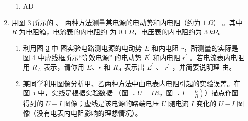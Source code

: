\begin{enumerate}
{\begin{enumerate}
\begin{center}
\end{center}
\item 	
AD
\end{enumerate}
} 


\item 
用图 \ref{2020:北京16:1} 所示的  、  两种方法测量某电源的电动势和内电阻（约为 $ 1 \ \Omega $）
。其中 $ R $ 为电阻箱，电流表的内电阻约
为 $ 0.1 \ \Omega $，电压表的内电阻约为 $ 3 \ k\Omega $。
\begin{figure}[h!]
\centering
\begin{subfigure}{0.4\linewidth}
\centering
 
\caption{}\label{2020:北京16:1a}
\end{subfigure}
\hfil
\begin{subfigure}{0.4\linewidth}
\centering
 
\caption{}\label{2020:北京16:1b}
\end{subfigure}
\caption{}\label{2020:北京16:1}
\end{figure}

\begin{enumerate}
\item
利用图 \ref{2020:北京16:1} 中  图实验电路测电源的电动势 $ E $ 和内电阻 $ r $，所测量的实际是图 \ref{2020:北京16:2} 中虚线框所示“等效电源”
的电动势 $ E ^{\prime} $ 和内电阻 $ r ^{\prime} $ 。若电流表内电阻用 $ R_{A} $ 表示，请你用 $ E $、$ r $ 和 $ R_{A} $ 表示出 $ E ^{\prime} $ 、 $ r ^{\prime} $ ，并简要说明理
由。
\begin{figure}[h!]
\centering

\caption{}\label{2020:北京16:2}
\end{figure}



\item 
某同学利用图像分析甲、乙两种方法中由电表内电阻引起的实验误差。在图 \ref{2020:北京16:3} 中，实线是根据实验数据
（图  ：$ U=IR $，图  ：$\left.I=\frac{U}{R}\right)$）描点作图得到的 $ U-I $ 图像；虚线是该电源的路端电压 $ U $ 随电流 $ I $ 变化的
$ U-I $ 图像（没有电表内电阻影响的理想情况）。
\begin{figure}[h!]
\centering

\caption{}\label{2020:北京16:3}
\end{figure}





\end{enumerate}
\end{enumerate}
